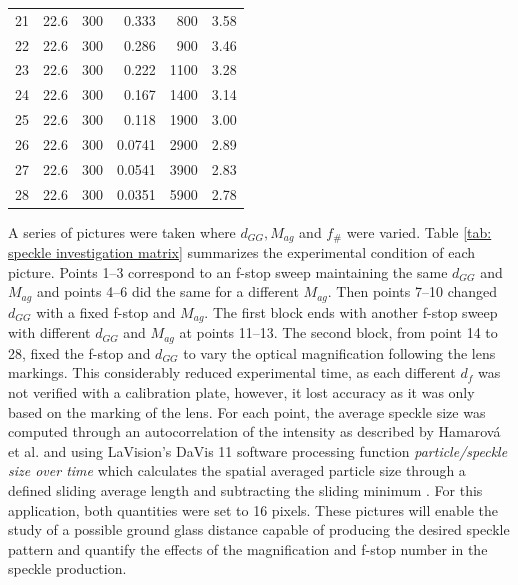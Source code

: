 \begin{table}[h]
\begin{tabular}{lrrrrr}
        21 & 22.6 & 300 & 0.333 &  800 & 3.58 \\
        22 & 22.6 & 300 & 0.286 &  900 & 3.46 \\
        23 & 22.6 & 300 & 0.222 & 1100 & 3.28 \\
        24 & 22.6 & 300 & 0.167 & 1400 & 3.14 \\
        25 & 22.6 & 300 & 0.118 & 1900 & 3.00 \\
        26 & 22.6 & 300 & 0.0741 & 2900 & 2.89 \\
        27 & 22.6 & 300 & 0.0541 & 3900 & 2.83 \\
        28 & 22.6 & 300 & 0.0351 & 5900 & 2.78 \\
        \bottomrule
    \end{tabular}
\end{table}

A series of pictures were taken where $d_{GG}, M_{ag}$ and $f_\#$ were varied. Table \ref{tab: speckle investigation matrix} summarizes the experimental condition of each picture. Points 1--3 correspond to an f-stop sweep maintaining the same $d_{GG}$ and $M_{ag}$ and points 4--6 did the same for a different $M_{ag}$. Then points 7--10 changed $d_{GG}$ with a fixed f-stop and $M_{ag}$. The first block ends with another f-stop sweep with different $d_{GG}$ and $M_{ag}$ at points 11--13. The second block, from point 14 to 28, fixed the f-stop and $d_{GG}$ to vary the optical magnification following the lens markings. This considerably reduced experimental time, as each different $d_f$ was not verified with a calibration plate, however, it lost accuracy as it was only based on the marking of the lens. For each point, the average speckle size was computed through an autocorrelation of the intensity as described by Hamarová et al. \cite{Hamarova2016} and using LaVision's DaVis 11 software processing function \emph{particle/speckle size over time} which calculates the spatial averaged particle size through a defined sliding average length and subtracting the sliding minimum \cite{Pan2010}. For this application, both quantities were set to 16 pixels. These pictures will enable the study of a possible ground glass distance capable of producing the desired speckle pattern and quantify the effects of the magnification and f-stop number in the speckle production.


